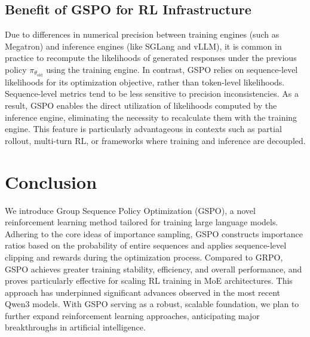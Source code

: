 \subsection{Benefit of GSPO for RL Infrastructure}

Due to differences in numerical precision between training engines (such as Megatron) and inference engines (like SGLang and vLLM), it is common in practice to recompute the likelihoods of generated responses under the previous policy $\pi_{\theta_\text{old}}$ using the training engine. In contrast, GSPO relies on sequence-level likelihoods for its optimization objective, rather than token-level likelihoods. Sequence-level metrics tend to be less sensitive to precision inconsistencies. As a result, GSPO enables the direct utilization of likelihoods computed by the inference engine, eliminating the necessity to recalculate them with the training engine. This feature is particularly advantageous in contexts such as partial rollout, multi-turn RL, or frameworks where training and inference are decoupled.

\section{Conclusion}

We introduce Group Sequence Policy Optimization (GSPO), a novel reinforcement learning method tailored for training large language models. Adhering to the core ideas of importance sampling, GSPO constructs importance ratios based on the probability of entire sequences and applies sequence-level clipping and rewards during the optimization process. Compared to GRPO, GSPO achieves greater training stability, efficiency, and overall performance, and proves particularly effective for scaling RL training in MoE architectures. This approach has underpinned significant advances observed in the most recent Qwen3 models. With GSPO serving as a robust, scalable foundation, we plan to further expand reinforcement learning approaches, anticipating major breakthroughs in artificial intelligence.

